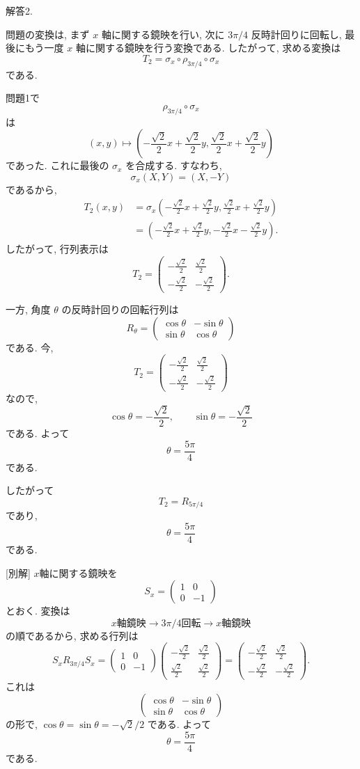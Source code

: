 \documentclass[dvipdfmx,a4paper,11pt]{article} %
\theoremstyle{definition}
\begin{document}
解答2. 

問題の変換は, まず $x$ 軸に関する鏡映を行い, 次に
$3\pi/4$ 反時計回りに回転し, 最後にもう一度 $x$ 軸に関する鏡映を行う変換である. したがって, 求める変換は
\[
T_2
=
\sigma_x\circ \rho_{3\pi/4}\circ \sigma_x
\]
である.

問題1で
\[
\rho_{3\pi/4}\circ \sigma_x
\]
は
\[
(x,y)
\longmapsto
\left(
-\frac{\sqrt2}{2}x+\frac{\sqrt2}{2}y,
\frac{\sqrt2}{2}x+\frac{\sqrt2}{2}y
\right)
\]
であった. これに最後の $\sigma_x$ を合成する. すなわち,
\[
\sigma_x(X,Y)=(X,-Y)
\]
であるから,
\begin{align*}
T_2(x,y)
&=
\sigma_x
\left(
-\frac{\sqrt2}{2}x+\frac{\sqrt2}{2}y,
\frac{\sqrt2}{2}x+\frac{\sqrt2}{2}y
\right)
\\
&=
\left(
-\frac{\sqrt2}{2}x+\frac{\sqrt2}{2}y,
-\frac{\sqrt2}{2}x-\frac{\sqrt2}{2}y
\right).
\end{align*}
したがって, 行列表示は
\[
T_2
=
\begin{pmatrix}
-\frac{\sqrt2}{2}&\frac{\sqrt2}{2}\\
-\frac{\sqrt2}{2}&-\frac{\sqrt2}{2}
\end{pmatrix}.
\]

一方, 角度 $\theta$ の反時計回りの回転行列は
\[
R_\theta
=
\begin{pmatrix}
\cos\theta&-\sin\theta\\
\sin\theta&\cos\theta
\end{pmatrix}
\]
である. 今,
\[
T_2
=
\begin{pmatrix}
-\frac{\sqrt2}{2}&\frac{\sqrt2}{2}\\
-\frac{\sqrt2}{2}&-\frac{\sqrt2}{2}
\end{pmatrix}
\]
なので,
\[
\cos\theta=-\frac{\sqrt2}{2},
\qquad
\sin\theta=-\frac{\sqrt2}{2}
\]
である. よって
\[
\theta=\frac{5\pi}{4}
\]
である.

したがって
\[
\boxed{
T_2=R_{5\pi/4}
}
\]
であり,
\[
\boxed{
\theta=\frac{5\pi}{4}
}
\]
である.

[別解]
$x$軸に関する鏡映を
\[
S_x=
\begin{pmatrix}
1&0\\
0&-1
\end{pmatrix}
\]
とおく. 変換は
\[
\text{$x$軸鏡映}
\longrightarrow
\text{$3\pi/4$回転}
\longrightarrow
\text{$x$軸鏡映}
\]
の順であるから, 求める行列は
\[
S_xR_{3\pi/4}S_x
=
\begin{pmatrix}
1&0\\
0&-1
\end{pmatrix}
\begin{pmatrix}
-\frac{\sqrt2}{2}&\frac{\sqrt2}{2}\\
\frac{\sqrt2}{2}&\frac{\sqrt2}{2}
\end{pmatrix}
=
\begin{pmatrix}
-\frac{\sqrt2}{2}&\frac{\sqrt2}{2}\\
-\frac{\sqrt2}{2}&-\frac{\sqrt2}{2}
\end{pmatrix}.
\]
これは
\[
\begin{pmatrix}
\cos\theta&-\sin\theta\\
\sin\theta&\cos\theta
\end{pmatrix}
\]
の形で, $\cos\theta=\sin\theta=-\sqrt2/2$ である. よって
\[
\boxed{\theta=\frac{5\pi}{4}}
\]
である.
\end{document}
